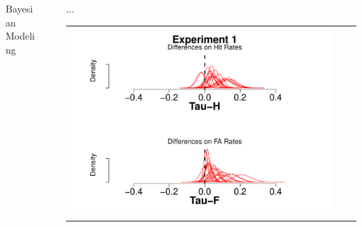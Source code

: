 \documentclass[final]{beamer}
\newlength{\sepwid}
\newlength{\onecolwid}
\newlength{\twocolwid}
\begin{document}
\begin{frame}[t]
\begin{columns}[t]
\begin{column}{\twocolwid}
\begin{columns}[t,totalwidth=\twocolwid]
\begin{column}{\onecolwid}
\begin{alertblock}{Bayesian Modeling}
\end{alertblock}


\end{column} %

\end{columns} %


\begin{columns}[t,totalwidth=\twocolwid] %

\begin{column}{\onecolwid} %


\end{column} %

\end{columns} %

\end{column} %

\begin{column}{\sepwid}\end{column} %

\begin{column}{\onecolwid} %

\begin{alertblock}{...}

\begin{center}
\begin{tabular}{ccc}
\includegraphics[width=0.6\linewidth]{Figures/Tau_1.pdf}
\end{tabular}
\end{center}


\end{alertblock}
\end{column}
\end{columns}
\end{frame}
\end{document}
